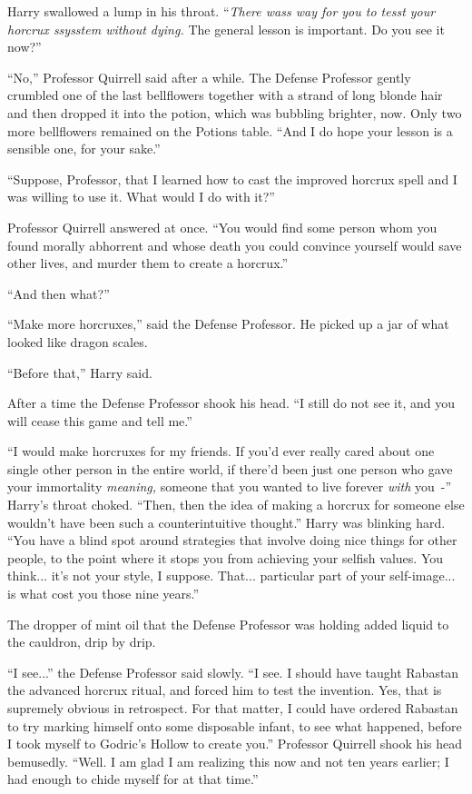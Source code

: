 Harry swallowed a lump in his throat. ``\emph{There wass way for you to tesst your horcrux ssysstem without dying.} The general lesson is important. Do you see it now?''

``No,'' Professor Quirrell said after a while. The Defense Professor gently crumbled one of the last bellflowers together with a strand of long blonde hair and then dropped it into the potion, which was bubbling brighter, now. Only two more bellflowers remained on the Potions table. ``And I do hope your lesson is a sensible one, for your sake.''

``Suppose, Professor, that I learned how to cast the improved horcrux spell and I was willing to use it. What would I do with it?''

Professor Quirrell answered at once. ``You would find some person whom you found morally abhorrent and whose death you could convince yourself would save other lives, and murder them to create a horcrux.''

``And then what?''

``Make more horcruxes,'' said the Defense Professor. He picked up a jar of what looked like dragon scales.

``Before that,'' Harry said.

After a time the Defense Professor shook his head. ``I still do not see it, and you will cease this game and tell me.''

``I would make horcruxes for my friends. If you'd ever really cared about one single other person in the entire world, if there'd been just one person who gave your immortality \emph{meaning,} someone that you wanted to live forever \emph{with} you~-'' Harry's throat choked. ``Then, then the idea of making a horcrux for someone else wouldn't have been such a counterintuitive thought.'' Harry was blinking hard. ``You have a blind spot around strategies that involve doing nice things for other people, to the point where it stops you from achieving your selfish values. You think... it's not your style, I suppose. That... particular part of your self-image... is what cost you those nine years.''

The dropper of mint oil that the Defense Professor was holding added liquid to the cauldron, drip by drip.

``I see...'' the Defense Professor said slowly. ``I see. I should have taught Rabastan the advanced horcrux ritual, and forced him to test the invention. Yes, that is supremely obvious in retrospect. For that matter, I could have ordered Rabastan to try marking himself onto some disposable infant, to see what happened, before I took myself to Godric's Hollow to create you.'' Professor Quirrell shook his head bemusedly. ``Well. I am glad I am realizing this now and not ten years earlier; I had enough to chide myself for at that time.''

